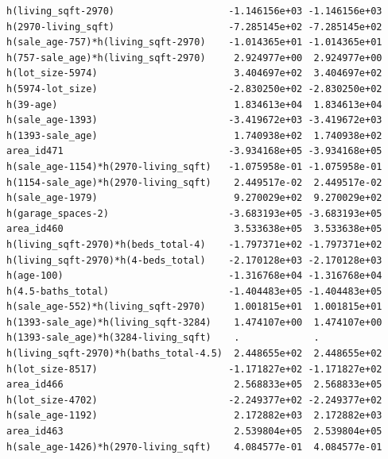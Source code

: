 \documentclass[
]{article}
\begin{document}
\begin{verbatim}
h(living_sqft-2970)                    -1.146156e+03 -1.146156e+03
h(2970-living_sqft)                    -7.285145e+02 -7.285145e+02
h(sale_age-757)*h(living_sqft-2970)    -1.014365e+01 -1.014365e+01
h(757-sale_age)*h(living_sqft-2970)     2.924977e+00  2.924977e+00
h(lot_size-5974)                        3.404697e+02  3.404697e+02
h(5974-lot_size)                       -2.830250e+02 -2.830250e+02
h(39-age)                               1.834613e+04  1.834613e+04
h(sale_age-1393)                       -3.419672e+03 -3.419672e+03
h(1393-sale_age)                        1.740938e+02  1.740938e+02
area_id471                             -3.934168e+05 -3.934168e+05
h(sale_age-1154)*h(2970-living_sqft)   -1.075958e-01 -1.075958e-01
h(1154-sale_age)*h(2970-living_sqft)    2.449517e-02  2.449517e-02
h(sale_age-1979)                        9.270029e+02  9.270029e+02
h(garage_spaces-2)                     -3.683193e+05 -3.683193e+05
area_id460                              3.533638e+05  3.533638e+05
h(living_sqft-2970)*h(beds_total-4)    -1.797371e+02 -1.797371e+02
h(living_sqft-2970)*h(4-beds_total)    -2.170128e+03 -2.170128e+03
h(age-100)                             -1.316768e+04 -1.316768e+04
h(4.5-baths_total)                     -1.404483e+05 -1.404483e+05
h(sale_age-552)*h(living_sqft-2970)     1.001815e+01  1.001815e+01
h(1393-sale_age)*h(living_sqft-3284)    1.474107e+00  1.474107e+00
h(1393-sale_age)*h(3284-living_sqft)    .             .           
h(living_sqft-2970)*h(baths_total-4.5)  2.448655e+02  2.448655e+02
h(lot_size-8517)                       -1.171827e+02 -1.171827e+02
area_id466                              2.568833e+05  2.568833e+05
h(lot_size-4702)                       -2.249377e+02 -2.249377e+02
h(sale_age-1192)                        2.172882e+03  2.172882e+03
area_id463                              2.539804e+05  2.539804e+05
h(sale_age-1426)*h(2970-living_sqft)    4.084577e-01  4.084577e-01
                                                                  

\end{verbatim}
\end{document}
